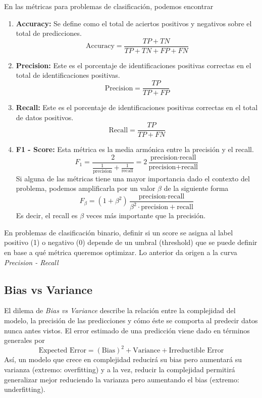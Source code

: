 En las métricas para problemas de clasificación, podemos encontrar
\begin{enumerate}
    \item \textbf{Accuracy:} Se define como el total de aciertos positivos y negativos sobre el total de predicciones. 
    $$ 
    \text{Accuracy} = \frac{TP + TN}{TP + TN + FP + FN}
    $$
    \item \textbf{Precision:} Este es el porcentaje de identificaciones positivas correctas en el total de identificaciones positivas. 
    $$
    \text{Precision} = \frac{TP}{TP + FP}
    $$
    \item \textbf{Recall: } Este es el porcentaje de identificaciones positivas correctas en el total de datos positivos. 
    $$ 
    \text{Recall} = \frac{TP}{TP + FN}
    $$
    \item \textbf{F1 - Score: } Esta métrica es la media armónica entre la precisión y el recall. 
    $$ 
    F_{1} = \frac{2}{\frac{1}{\text{precision}} + \frac{1}{\text{recall}}} = 2 \frac{\text{precision} \cdot \text{recall}}{\text{precision} + \text{recall}}
    $$
    Si alguna de las métricas tiene una mayor importancia dado el contexto del problema, podemos amplificarla por un valor $\beta$ de la siguiente forma
    $$ 
    F_{\beta} = (1 + \beta^2) \frac{\text{precision} \cdot \text{recall}}{\beta^2 \cdot \text{precision} + \text{recall}}
    $$
    Es decir, el recall es $\beta$ veces más importante que la precisión. 
\end{enumerate}

En problemas de clasificación binario, definir si un score se asigna al label positivo (1) o negativo (0) depende de un umbral (threshold) que se puede definir en base a qué métrica queremos optimizar. Lo anterior da origen a la curva \textit{Precision - Recall}





\subsection{Bias vs Variance}

El dilema de \textit{Bias vs Variance} describe la relación entre la complejidad del modelo, la precisión de las predicciones y cómo éste se comporta al predecir datos nunca antes vistos. El error estimado de una predicción viene dado en términos generales por 
$$
\text{Expected Error} = (\text{Bias})^2 + \text{Variance} + \text{Irreductible Error}
$$
Así, un modelo que crece en complejidad reducirá su bias pero aumentará su varianza (extremo: overfitting) y a la vez, reducir la complejidad permitirá generalizar mejor reduciendo la varianza pero aumentando el bias (extremo: underfitting). 

